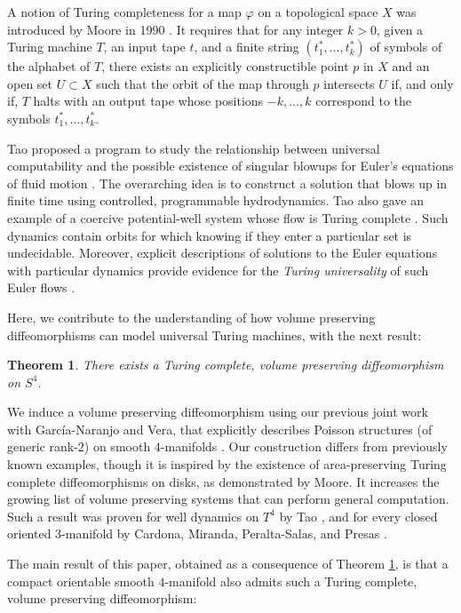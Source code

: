 \documentclass{amsart}
\newtheorem{Theorem}{Theorem}
\begin{document}
A notion of Turing completeness for a map $\varphi$ on a topological space $X$ was introduced by Moore in 1990 \cite{Moore}.
It requires that for any integer $k>0$, given a Turing machine $T$, an input tape $t$, and a finite string $(t_{1}^{\ast}, \ldots , t_{k}^{\ast})$ of symbols of the alphabet of $T$, there exists an explicitly constructible point $p$ in $X$ and an open set  $U\subset X$ such that the orbit of the map through $p$ intersects $U$ if, and only if, $T$ halts with an output tape whose positions $-k, \ldots , k$ correspond to the symbols $t_{1}^{\ast}, \ldots , t_{k}^{\ast}$. 

Tao proposed a program to study the relationship between universal computability and the possible existence of singular blowups for Euler's equations of fluid motion  \cite{Tao16, Tao16-2}. 
The overarching idea is to construct a solution that blows up in finite time using controlled, programmable hydrodynamics. 
Tao also gave an example of a coercive potential-well system whose flow is Turing complete \cite{Tao17}. 
 Such dynamics contain orbits for which knowing if they enter a particular set is undecidable. 
 Moreover, explicit descriptions of solutions to the Euler equations with particular dynamics provide evidence for the {\it Turing universality} of such Euler flows \cite{Tao18}.  

Here, we contribute to the understanding of how volume preserving diffeomorphisms can model universal Turing machines, with the next result:

\begin{Theorem}\label{thm:TCvol-pres-flow-S4}
There exists a Turing complete, volume preserving diffeomorphism on $S^4$.
\end{Theorem}

 We induce a volume preserving diffeomorphism using our previous joint work with Garc\'ia-Naranjo and Vera, that explicitly describes Poisson structures (of generic rank-$2$) on smooth $4$-manifolds \cite{GSV15}. 
 Our construction differs from previously known examples, though it is inspired by the existence of area-preserving Turing complete diffeomorphisms on disks, as demonstrated by Moore.
  It increases the growing list of  volume preserving systems that can perform general computation. 
 Such a result was proven for well dynamics on $T^4$ by Tao \cite[\S 4]{Tao17}, and for every closed oriented $3$-manifold by Cardona, Miranda, Peralta-Salas, and Presas \cite{CMPP21}. 
 
 
 The main result of this paper, obtained as a consequence of Theorem \ref{thm:TCvol-pres-flow-S4}, is that a compact orientable smooth $4$-manifold also admits such a Turing complete, volume preserving diffeomorphism:
 
\end{document}
